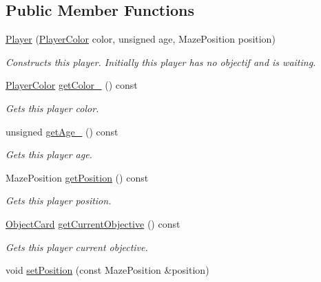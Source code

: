 \subsection*{Public Member Functions}
\begin{DoxyCompactItemize}
\item 
\mbox{\hyperlink{structlabyrinth_1_1_player_adb42eb8f577c39df39be8359642c67ca}{Player}} (\mbox{\hyperlink{structlabyrinth_1_1_player_a23119c6cf615f70b86380d07ab692c75}{Player\+Color}} color, unsigned age, Maze\+Position position)
\begin{DoxyCompactList}\small\item\em Constructs this player. Initially this player has no objectif and is waiting. \end{DoxyCompactList}\item 
\mbox{\hyperlink{structlabyrinth_1_1_player_a23119c6cf615f70b86380d07ab692c75}{Player\+Color}} \mbox{\hyperlink{structlabyrinth_1_1_player_a5eca20c5ec20e8d1bf3a5b35881cd0c5}{get\+Color\+\_\+}} () const
\begin{DoxyCompactList}\small\item\em Gets this player color. \end{DoxyCompactList}\item 
unsigned \mbox{\hyperlink{structlabyrinth_1_1_player_ae1a9f94b0cff74d84de1eeddc868c32f}{get\+Age\+\_\+}} () const
\begin{DoxyCompactList}\small\item\em Gets this player age. \end{DoxyCompactList}\item 
Maze\+Position \mbox{\hyperlink{structlabyrinth_1_1_player_a5c137813c71681bbcc2f7423dc7340a1}{get\+Position}} () const
\begin{DoxyCompactList}\small\item\em Gets this player position. \end{DoxyCompactList}\item 
\mbox{\hyperlink{structlabyrinth_1_1_object_card}{Object\+Card}} \mbox{\hyperlink{structlabyrinth_1_1_player_a112a9f469e58c6fff3ab6b8b16bc89a4}{get\+Current\+Objective}} () const
\begin{DoxyCompactList}\small\item\em Gets this player current objective. \end{DoxyCompactList}\item 
void \mbox{\hyperlink{structlabyrinth_1_1_player_a25f97e3973de17d8a72dfbd136126a96}{set\+Position}} (const Maze\+Position \&position)

\end{DoxyCompactItemize}
